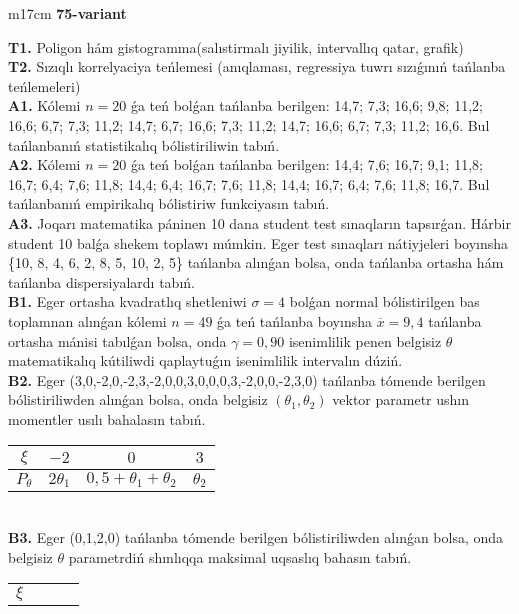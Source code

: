 \documentclass{article}
\begin{document}
\begin{tabular}{m{17cm}}
\textbf{75-variant}
\newline

\textbf{T1.} 
Poligon hám gistogramma(salıstirmalı jiyilik, intervallıq qatar, grafik)
 \\
\textbf{T2.} 
Sızıqlı korrelyaciya teńlemesi (anıqlaması, regressiya tuwrı sızıǵınıń tańlanba teńlemeleri)
 \\
\textbf{A1.} 
Kólemi \(n = 20\) ǵa teń bolǵan tańlanba berilgen: 14,7; 7,3; 16,6; 9,8; 11,2; 16,6; 6,7; 7,3; 11,2; 14,7; 6,7; 16,6; 7,3; 11,2; 14,7; 16,6; 6,7; 7,3; 11,2; 16,6. Bul tańlanbanıń statistikalıq bólistiriliwin tabıń.
 \\
\textbf{A2.} 
Kólemi \(n = 20\) ǵa teń bolǵan tańlanba berilgen: 14,4; 7,6; 16,7; 9,1; 11,8; 16,7; 6,4; 7,6; 11,8; 14,4; 6,4; 16,7; 7,6; 11,8; 14,4; 16,7; 6,4; 7,6; 11,8; 16,7. Bul tańlanbanıń empirikalıq bólistiriw funkciyasın tabıń.
 \\
\textbf{A3.} 
Joqarı matematika páninen 10 dana student test sınaqların tapsırǵan. Hárbir student 10 balǵa shekem toplawı múmkin. Eger test sınaqları nátiyjeleri boyınsha \{10, 8, 4, 6, 2, 8, 5, 10, 2, 5\} tańlanba alınǵan bolsa, onda tańlanba ortasha hám tańlanba dispersiyalardı tabıń.
 \\
\textbf{B1.} 
Eger ortasha kvadratlıq shetleniwi \(\sigma = 4\) bolǵan normal bólistirilgen bas toplamnan alınǵan kólemi \(n = 49\) ǵa teń tańlanba boyınsha \(\overline{x} = 9,4\) tańlanba ortasha mánisi tabılǵan bolsa, onda \(\gamma = 0,90\) isenimlilik penen belgisiz \(\theta\) matematikalıq kútiliwdi qaplaytuǵın isenimlilik intervalın dúziń.
 \\
\textbf{B2.} 
Eger (3,0,-2,0,-2,3,-2,0,0,3,0,0,0,3,-2,0,0,-2,3,0) tańlanba tómende berilgen bólistiriliwden alınǵan bolsa, onda belgisiz \(\left( \theta_{1},\theta_{2} \right)\) vektor parametr ushın momentler usılı bahalasın tabıń.
\begin{tabular}{|c|c|c|c|}
  \hline
$\xi$ &
$- 2$ &
$0$ &
$3$\\
\hline
\(P_{\theta}\) & \({2\theta}_{1}\) & \(0,5 + \theta_{1} + \theta_{2}\) & \(\theta_{2}\) \\
\hline
\end{tabular}
 \\
\textbf{B3.} 
Eger (0,1,2,0) tańlanba tómende berilgen bólistiriliwden alınǵan bolsa, onda belgisiz \(\theta\) parametrdiń shınlıqqa maksimal uqsaslıq bahasın tabıń.
\begin{tabular}{|c|c|c|c|}
  \hline
$\xi$

\end{tabular}
\end{tabular}
\end{document}
